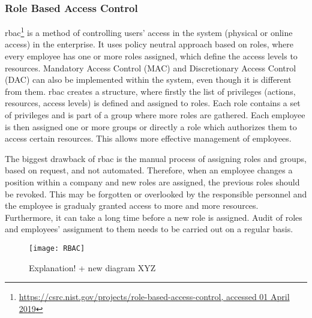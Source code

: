 \subsubsection{Role Based Access Control} \label{sec:sota-rbac}

\acrfull{rbac}\footnote{\url{https://csrc.nist.gov/projects/role-based-access-control, accessed 01 April 2019}} is a method of controlling users' access in the system (physical or online access) in the enterprise. It uses policy neutral approach based on roles, where every employee has one or more roles assigned, which define the access levels to resources. Mandatory Access Control (MAC) and Discretionary Access Control (DAC) can also be implemented within the system, even though it is different from them. \acrshort{rbac} creates a structure, where firstly the list of privileges (actions, resources, access levels) is defined and assigned to roles. Each role contains a set of privileges and is part of a group where more roles are gathered. Each employee is then assigned one or more groups or directly a role which authorizes them to access certain resources. This allows more effective management of employees.

The biggest drawback of \acrshort{rbac} is the manual process of assigning roles and groups, based on request, and not automated. Therefore, when an employee changes a position within a company and new roles are assigned, the previous roles should be revoked. This may be forgotten or overlooked by the responsible personnel and the employee is gradualy granted access to more and more resources. Furthermore, it can take a long time before a new role is assigned. Audit of roles and employees’ assignment to them needs to be carried out on a regular basis.

\begin{figure}[ht]
    \centering
    \texttt{[image: RBAC]}
    \caption{Explanation! + new diagram XYZ}
    \label{fig:RBAC_diagram_sota}
\end{figure}
